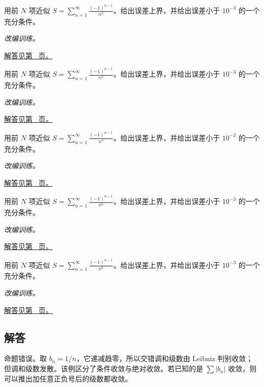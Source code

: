 \documentclass[UTF8,12pt,a4paper,fontset=fandol]{ctexart}
\begin{document}
\begin{example}[交错级数的误差控制]\label{ex:c26q21}
用前 $N$ 项近似 $\displaystyle S=\sum_{n=1}^\infty\frac{(-1)^{n-1}}{n^{2}}$。给出误差上界，并给出误差小于 $10^{-3}$ 的一个充分条件。
\par\textit{改编训练。}\par\hyperref[ans:c26q21]{解答见第~\pageref{ans:c26q21} 页。}
\end{example}
\begin{example}[交错级数的误差控制]\label{ex:c26q22}
用前 $N$ 项近似 $\displaystyle S=\sum_{n=1}^\infty\frac{(-1)^{n-1}}{n^{3}}$。给出误差上界，并给出误差小于 $10^{-3}$ 的一个充分条件。
\par\textit{改编训练。}\par\hyperref[ans:c26q22]{解答见第~\pageref{ans:c26q22} 页。}
\end{example}
\begin{example}[交错级数的误差控制]\label{ex:c26q23}
用前 $N$ 项近似 $\displaystyle S=\sum_{n=1}^\infty\frac{(-1)^{n-1}}{n^{4}}$。给出误差上界，并给出误差小于 $10^{-3}$ 的一个充分条件。
\par\textit{改编训练。}\par\hyperref[ans:c26q23]{解答见第~\pageref{ans:c26q23} 页。}
\end{example}
\begin{example}[交错级数的误差控制]\label{ex:c26q24}
用前 $N$ 项近似 $\displaystyle S=\sum_{n=1}^\infty\frac{(-1)^{n-1}}{n^{5}}$。给出误差上界，并给出误差小于 $10^{-3}$ 的一个充分条件。
\par\textit{改编训练。}\par\hyperref[ans:c26q24]{解答见第~\pageref{ans:c26q24} 页。}
\end{example}
\begin{example}[交错级数的误差控制]\label{ex:c26q25}
用前 $N$ 项近似 $\displaystyle S=\sum_{n=1}^\infty\frac{(-1)^{n-1}}{n^{6}}$。给出误差上界，并给出误差小于 $10^{-3}$ 的一个充分条件。
\par\textit{改编训练。}\par\hyperref[ans:c26q25]{解答见第~\pageref{ans:c26q25} 页。}
\end{example}
\subsection{解答}
\begin{solve}\label{ans:c26q1}
命题错误。取 $b_n=1/n$，它递减趋零，所以交错调和级数由 Leibniz 判别收敛；但调和级数发散。该例区分了条件收敛与绝对收敛。若已知的是 $\sum|b_n|$ 收敛，则可以推出加任意正负号后的级数都收敛。
\end{solve}
\end{document}
